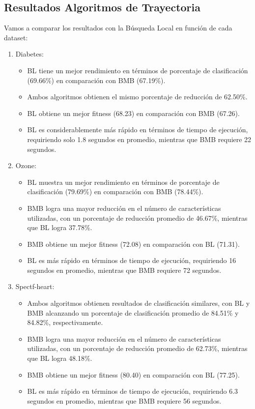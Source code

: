 \subsection{Resultados Algoritmos de Trayectoria}


Vamos a comparar los resultados con la Búsqueda Local en función de cada dataset:

\begin{enumerate}
\item Diabetes: 
\begin{itemize}
\item BL tiene un mejor rendimiento en términos de porcentaje de clasificación (69.66\%) en comparación con BMB (67.19\%).
\item Ambos algoritmos obtienen el mismo porcentaje de reducción de 62.50\%.
\item BL obtiene un mejor fitness (68.23) en comparación con BMB (67.26).
\item BL es considerablemente más rápido en términos de tiempo de ejecución, requiriendo solo 1.8 segundos en promedio, mientras que BMB requiere 22 segundos.
\end{itemize}

\item Ozone:
\begin{itemize}
\item BL muestra un mejor rendimiento en términos de porcentaje de clasificación (79.69\%) en comparación con BMB (78.44\%).
\item BMB logra una mayor reducción en el número de características utilizadas, con un porcentaje de reducción promedio de 46.67\%, mientras que BL logra 37.78\%.
\item BMB obtiene un mejor fitness (72.08) en comparación con BL (71.31).
\item BL es más rápido en términos de tiempo de ejecución, requiriendo 16 segundos en promedio, mientras que BMB requiere 72 segundos.
\end{itemize}

\item Spectf-heart:
\begin{itemize}
	\item Ambos algoritmos obtienen resultados de clasificación similares, con BL y BMB alcanzando un porcentaje de clasificación promedio de 84.51\% y 84.82\%, respectivamente.
	\item BMB logra una mayor reducción en el número de características utilizadas, con un porcentaje de reducción promedio de 62.73\%, mientras que BL logra 48.18\%.
	\item BMB obtiene un mejor fitness (80.40) en comparación con BL (77.25).
	\item BL es más rápido en términos de tiempo de ejecución, requiriendo 6.3 segundos en promedio, mientras que BMB requiere 56 segundos.
\end{itemize}

\end{enumerate}

